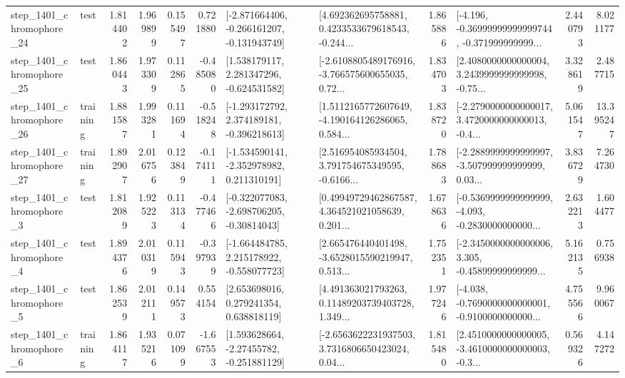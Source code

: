 \begin{tabular}{llrrrrllrlrr}
 step\_1401\_chromophore\_24 &      test &      1.814402 &    1.969899 &      0.155497 &  0.721880 &  [-2.871664406, -0.266161207, -0.131943749] &  [4.692362695758881, 0.4233533679618543, -0.244... &       1.865886 &  [-4.196, -0.36999999999999744, -0.371999999999... &            2.440793 &          8.021177 \\
 step\_1401\_chromophore\_25 &      test &      1.860443 &    1.973309 &      0.112865 & -0.485080 &    [1.538179117, 2.281347296, -0.624531582] &  [-2.6108805489176916, -3.766575600655035, 0.72... &       1.834703 &  [2.4080000000000004, 3.2439999999999998, -0.75... &            3.328619 &          2.487715 \\
 step\_1401\_chromophore\_26 &  training &      1.881587 &    1.993281 &      0.111694 & -0.518248 &   [-1.293172792, 2.374189181, -0.396218613] &  [1.5112165772607649, -4.190164126286065, 0.584... &       1.838720 &  [-2.2790000000000017, 3.4720000000000013, -0.4... &            5.061547 &         13.395247 \\
 step\_1401\_chromophore\_27 &  training &      1.892907 &    2.016756 &      0.123849 & -0.174111 &   [-1.534590141, -2.352978982, 0.211310191] &  [2.516954085934504, 3.791754675349595, -0.6166... &       1.788683 &  [-2.2889999999999997, -3.507999999999999, 0.03... &            3.836729 &          7.264730 \\
  step\_1401\_chromophore\_3 &      test &      1.812089 &    1.925223 &      0.113134 & -0.477466 &   [-0.322077083, -2.698706205, -0.30814043] &  [0.49949729462867587, 4.364521021058639, 0.201... &       1.678636 &  [-0.5369999999999999, -4.093, -0.2830000000000... &            2.632213 &          1.604477 \\
  step\_1401\_chromophore\_4 &      test &      1.894376 &    2.010319 &      0.115943 & -0.397939 &   [-1.664484785, 2.215178922, -0.558077723] &  [2.665476440401498, -3.6528015590219947, 0.513... &       1.752351 &  [-2.3450000000000006, 3.305, -0.45899999999999... &            5.162135 &          0.756938 \\
  step\_1401\_chromophore\_5 &      test &      1.862539 &    2.012111 &      0.149573 &  0.554154 &     [2.653698016, 0.279241354, 0.638818119] &  [4.491363021793263, 0.11489203739403728, 1.349... &       1.977246 &  [-4.038, -0.7690000000000001, -0.9100000000000... &            4.755566 &          9.960067 \\
  step\_1401\_chromophore\_6 &  training &      1.864117 &    1.935216 &      0.071099 & -1.667553 &    [1.593628664, -2.27455782, -0.251881129] &  [-2.6563622231937503, 3.7316806650423024, 0.04... &       1.815480 &  [2.4510000000000005, -3.4610000000000003, -0.3... &            0.569326 &          4.147272 \\

\end{tabular}

